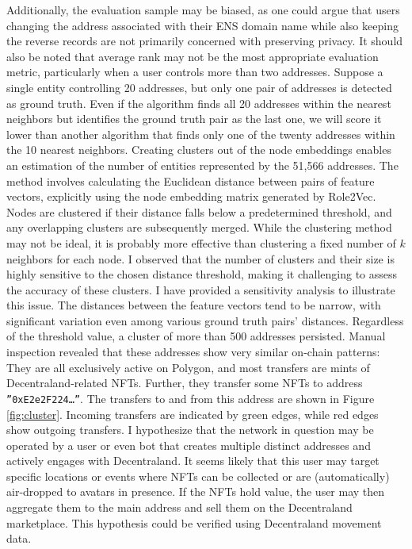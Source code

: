 \documentclass[12pt,a4paper,titlepage,oneside,english]{article}
\begin{document}
Additionally, the evaluation sample may be biased, as one could argue that users changing the address associated with their ENS domain name while also keeping the reverse records are not primarily concerned with preserving privacy. \newline
It should also be noted that average rank may not be the most appropriate evaluation metric, particularly when a user controls more than two addresses. Suppose a single entity controlling 20 addresses, but only one pair of addresses is detected as ground truth. Even if the algorithm finds all 20 addresses within the nearest neighbors but identifies the ground truth pair as the last one, we will score it lower than another algorithm that finds only one of the twenty addresses within the 10 nearest neighbors. \newline
Creating clusters out of the node embeddings enables an estimation of the number of entities represented by the 51,566 addresses. The method involves calculating the Euclidean distance between pairs of feature vectors, explicitly using the node embedding matrix generated by Role2Vec. Nodes are clustered if their distance falls below a predetermined threshold, and any overlapping clusters are subsequently merged. \newline 
While the clustering method may not be ideal, it is probably more effective than clustering a fixed number of $k$ neighbors for each node. I observed that the number of clusters and their size is highly sensitive to the chosen distance threshold, making it challenging to assess the accuracy of these clusters. I have provided a sensitivity analysis to illustrate this issue. The distances between the feature vectors tend to be narrow, with significant variation even among various ground truth pairs' distances. Regardless of the threshold value, a cluster of more than 500 addresses persisted. Manual inspection revealed that these addresses show very similar on-chain patterns: They are all exclusively active on Polygon, and most transfers are mints of Decentraland-related NFTs. Further, they transfer some NFTs to address \texttt{''0xE2e2F224\dots''}. The transfers to and from this address are shown in Figure \ref{fig:cluster}. Incoming transfers are indicated by green edges, while red edges show outgoing transfers. I hypothesize that the network in question may be operated by a user or even bot that creates multiple distinct addresses and actively engages with Decentraland. It seems likely that this user may target specific locations or events where NFTs can be collected or are (automatically) air-dropped to avatars in presence. If the NFTs hold value, the user may then aggregate them to the main address and sell them on the Decentraland marketplace. This hypothesis could be verified using Decentraland movement data. \newline
\end{document}
